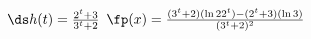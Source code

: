 {$\ds h(t) = \frac{2^t+3}{3^t+2}$
}
{$\fp(x) = \frac{(3^t+2)(\ln 2 2^t)-(2^t+3)(\ln 3)}{(3^t+2)^2}$
}
